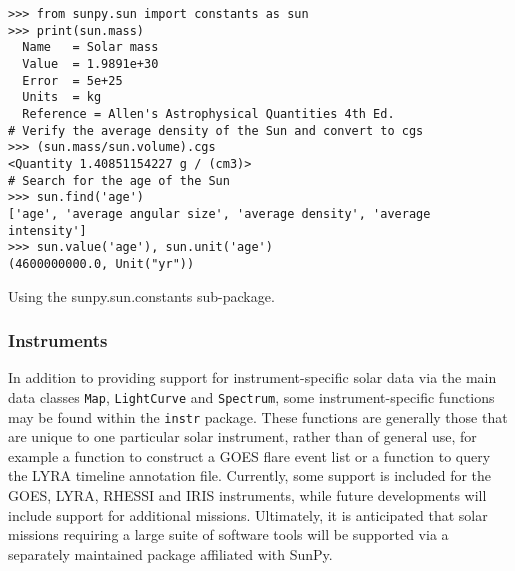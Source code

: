 \begin{listing}[H]
\begin{verbatim}
>>> from sunpy.sun import constants as sun
>>> print(sun.mass)
  Name   = Solar mass
  Value  = 1.9891e+30
  Error  = 5e+25
  Units  = kg
  Reference = Allen's Astrophysical Quantities 4th Ed.
# Verify the average density of the Sun and convert to cgs
>>> (sun.mass/sun.volume).cgs
<Quantity 1.40851154227 g / (cm3)>
# Search for the age of the Sun
>>> sun.find('age')
['age', 'average angular size', 'average density', 'average intensity']
>>> sun.value('age'), sun.unit('age')
(4600000000.0, Unit("yr"))
\end{verbatim}
\caption{Using the sunpy.sun.constants sub-package.}
\label{code:constants_code}
\end{listing}
	
\subsubsection{Instruments}\label{ssec:util:inst}
In addition to providing support for instrument-specific solar data via the main data 
classes \texttt{Map}, \texttt{LightCurve} and \texttt{Spectrum}, 
some instrument-specific functions may be found within the \texttt{instr} package. 
These functions are generally those that are unique to one particular solar instrument, 
rather than of general use, for example a function to construct a GOES flare event list 
or a function to query the LYRA timeline annotation file. Currently, some support is included
 for the GOES, LYRA, RHESSI and IRIS instruments, while future developments 
 will include support for additional missions. Ultimately, it is anticipated that solar
  missions requiring a large suite of software tools will be supported via a separately 
  maintained package affiliated with SunPy.

